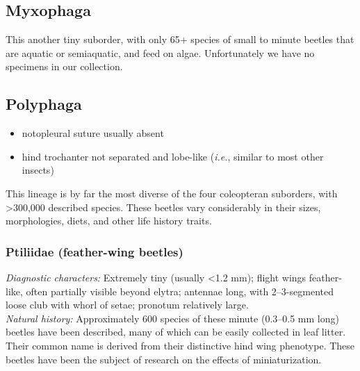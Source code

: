 \documentclass[letterpaper, 11pt]{article}
\begin{document}
\subsection{Myxophaga}
This another tiny suborder, with only 65+ species of small to minute beetles that are aquatic or semiaquatic, and feed on algae. Unfortunately we have no specimens in our collection.

\subsection{Polyphaga}
\begin{itemize}
\item notopleural suture usually absent
\item hind trochanter not separated and lobe-like (\textit{i.e.}, similar to most other insects) 
\end{itemize}
This lineage is by far the most diverse of the four coleopteran suborders, with \textgreater300,000 described species. These beetles vary considerably in their sizes, morphologies, diets, and other life history traits.

\subsubsection{Ptiliidae (feather-wing beetles)}
\noindent{}\textit{Diagnostic characters:} Extremely tiny (usually \textless1.2 mm); flight wings feather-like, often partially visible beyond elytra; antennae long, with 2--3-segmented loose club with whorl of setae; pronotum relatively large.\\

\noindent{}\textit{Natural history:} Approximately 600 species of these minute (0.3--0.5 mm long) beetles have been described, many of which can be easily collected in leaf litter. Their common name is derived from their distinctive hind wing phenotype. These beetles have been the subject of research on the effects of miniaturization.
\end{document}

